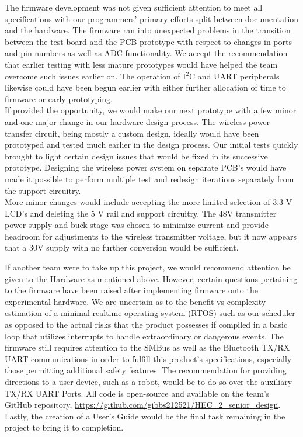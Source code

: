 \documentclass[12pt]{article}
\begin{document}
\indent
The firmware development was not given sufficient attention to meet all specifications with our programmers' primary efforts split between documentation and the hardware. The firmware ran into unexpected problems in the transition between the test board and the PCB prototype with respect to changes in ports and pin numbers as well as ADC functionality.  We accept the recommendation that earlier testing with less mature prototypes would have helped the team overcome such issues earlier on.  The operation of I$^2$C and UART peripherals likewise could have been begun earlier with either further allocation of time to firmware or early prototyping.\\

\indent
If provided the opportunity, we would make our next prototype with a few minor and one major change in our hardware design process. The wireless power transfer circuit, being mostly a custom design, ideally would have been prototyped and tested much earlier in the design process. Our initial tests quickly brought to light certain design issues that would be fixed in its successive prototype. Designing the wireless power system on separate PCB’s would have made it possible to perform multiple test and redesign iterations separately from the support circuitry.\\

\indent
More minor changes would include accepting the more limited selection of 3.3 V LCD’s and deleting the 5 V rail and support circuitry. The 48V transmitter power supply and buck stage was chosen to minimize current and provide headroom for adjustments to the wireless transmitter voltage, but it now appears that a 30V supply with no further conversion would be sufficient.\hfill
\pagebreak

\indent
If another team were to take up this project, we would recommend attention be given to the Hardware as mentioned above.  However, certain questions pertaining to the firmware have been raised after implementing firmware onto the experimental hardware.  We are uncertain as to the benefit vs complexity estimation of a minimal realtime operating system (RTOS) such as our scheduler as opposed to the actual risks that the product possesses if compiled in a basic loop that utilizes interrupts to handle extraordinary or dangerous events. The firmware still requires attention to the SMBus as well as the Bluetooth TX/RX UART communications in order to fulfill this product's specifications, especially those permitting additional safety features.  The recommendation for providing directions to a user device, such as a robot, would be to do so over the auxiliary TX/RX UART Ports.  All code is open-source and available on the team's GitHub repository, \url{https://github.com/gibbs212521/HEC\_2_senior_design}.  Lastly, the creation of a User's Guide would be the final task remaining in the project to bring it to completion.
\end{document}
